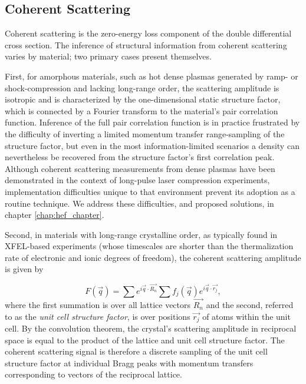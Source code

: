 \documentclass [11pt, proquest, article] {uwthesis}[2016/11/22]
\begin{document}
\label{coh}
\subsection{Coherent Scattering}
Coherent scattering is the zero-energy loss component of the double differential cross section.  The inference of structural information from coherent scattering varies by material; two primary cases present themselves.



First, for amorphous materials, such as hot dense plasmas generated by ramp- or shock-compression and lacking long-range order, the scattering amplitude is isotropic and is characterized by the one-dimensional static structure factor, which is connected by a Fourier transform to the material's pair correlation function. Inference of the full pair correlation function is in practice frustrated by the difficulty of inverting a limited momentum transfer range-sampling of the structure factor, but even in the most information-limited scenarios a density can nevertheless be recovered from the structure factor's first correlation peak. Although coherent scattering measurements from dense plasmas have been demonstrated in the context of long-pulse laser compression experiments, implementation difficulties unique to that environment prevent its adoption as a routine technique. We address these difficulties, and proposed solutions, in chapter \ref{chap:hef_chapter}. \cite{ma2013x}

Second, in materials with long-range crystalline order, as typically found in XFEL-based experiments (whose timescales are shorter than the thermalization rate of electronic and ionic degrees of freedom), the coherent scattering amplitude is given by

\begin{equation}
F(\vec{q}) = \sum e^{i \vec{q} \cdot \vec{R_n}} \sum f_j(\vec{q}) e^{i \vec{q} \cdot \vec{r_j}},
\end{equation}
where the first summation is over all lattice vectors $\vec{R_n}$ and the second, referred to as the \emph{unit cell structure factor}, is over positions $\vec{r_j}$ of atoms within the unit cell. By the convolution theorem, the crystal's scattering amplitude in reciprocal space is equal to the product of the lattice and unit cell structure factor. The coherent scattering signal is therefore a discrete sampling of the unit cell structure factor at individual Bragg peaks with momentum transfers corresponding to vectors of the reciprocal lattice.
\end{document}

